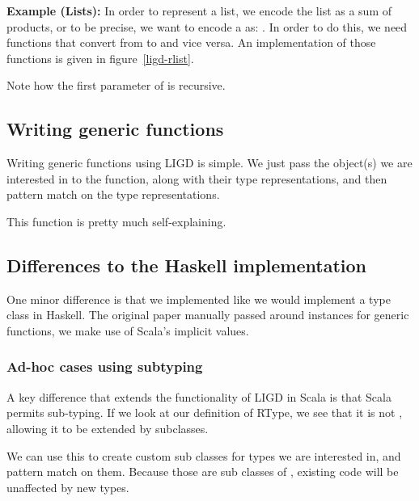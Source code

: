 \textbf{Example (Lists):} In order to represent a list, we encode the
list as a sum of products, or to be precise, we want to encode a 
as: . In order to do this, we need functions
that convert from  to  and
vice versa. An implementation of those functions is given in figure~\ref{ligd-rlist}.
%



Note how the first parameter of  is recursive.

\subsection{Writing generic functions}
Writing generic functions using LIGD is simple. We just pass the object(s)
we are interested in to the function, along with their type representations,
and then pattern match on the type representations.

  

This function is pretty much self-explaining.

\subsection{Differences to the Haskell implementation}
One minor difference is that we implemented  like we would implement
a type class in Haskell. The original paper manually passed around 
instances for generic functions, we make use of Scala's implicit values.


\subsubsection{Ad-hoc cases using subtyping}
A key difference that extends the functionality of LIGD in Scala is that
Scala permits sub-typing. If we look at our definition of RType, we see
that it is not , allowing it to be extended by subclasses.

We can use this to create custom sub classes for types we are interested
in, and pattern match on them. Because those are sub classes of ,
existing code will be unaffected by new types.

